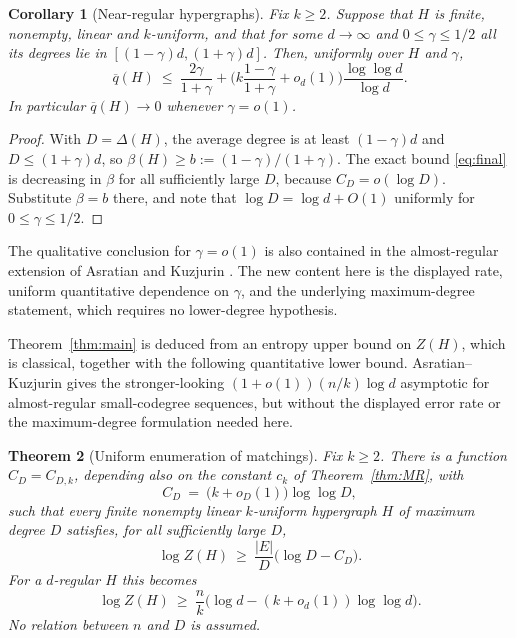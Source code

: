 \documentclass[10pt,a4paper]{amsart}
\newtheorem{theorem}{Theorem}[section]
\newtheorem{corollary}[theorem]{Corollary}
\newcommand{\EE}{E}
\newcommand{\qbar}{\overline{q}}
\newcommand{\Deltaop}{\Delta}
\begin{document}
\begin{corollary}[Near-regular hypergraphs]
\label{cor:nearregular}
Fix $k\ge2$. Suppose that $H$ is finite, nonempty, linear and $k$-uniform, and that for
some $d\to\infty$ and $0\le\gamma\le1/2$ all its degrees lie in
$[(1-\gamma)d,(1+\gamma)d]$. Then, uniformly over $H$ and $\gamma$,
\[
  \qbar(H)\ \le\ \frac{2\gamma}{1+\gamma}
  +\biggl(k\frac{1-\gamma}{1+\gamma}+o_d(1)\biggr)
       \frac{\log\log d}{\log d}.
\]
In particular $\qbar(H)\to0$ whenever $\gamma=o(1)$.
\end{corollary}

\begin{proof}
With $D=\Deltaop(H)$, the average degree is at least $(1-\gamma)d$ and
$D\le(1+\gamma)d$, so $\beta(H)\ge b:=(1-\gamma)/(1+\gamma)$. The exact bound
\eqref{eq:final} is decreasing in $\beta$ for all sufficiently large $D$, because
$C_D=o(\log D)$. Substitute $\beta=b$ there, and note that
$\log D=\log d+O(1)$ uniformly for $0\le\gamma\le1/2$.
\end{proof}

The qualitative conclusion for $\gamma=o(1)$ is also contained in the almost-regular
extension of Asratian and Kuzjurin \cite[\S3]{AsratianKuzjurin}. The new content here is
the displayed rate, uniform quantitative dependence on $\gamma$, and the underlying
maximum-degree statement, which requires no lower-degree hypothesis.

Theorem~\ref{thm:main} is deduced from an entropy upper bound on $Z(H)$, which is
classical, together with the following quantitative lower bound. Asratian--Kuzjurin
\cite[Corollary 1]{AsratianKuzjurin} gives the stronger-looking
$(1+o(1))(n/k)\log d$ asymptotic for almost-regular small-codegree sequences, but without the
displayed error rate or the maximum-degree formulation needed here.

\begin{theorem}[Uniform enumeration of matchings]
\label{thm:engine}
Fix $k\ge2$. There is a function $C_D=C_{D,k}$, depending also on the constant $c_k$ of
Theorem~\ref{thm:MR}, with
\[
  C_D\ =\ \bigl(k+o_D(1)\bigr)\log\log D,
\]
such that every finite nonempty linear $k$-uniform hypergraph $H$ of maximum degree $D$
satisfies, for all sufficiently large $D$,
\[
  \log Z(H)\ \ge\ \frac{|\EE|}{D}\bigl(\log D-C_D\bigr).
\]
For a $d$-regular $H$ this becomes
\[
  \log Z(H)\ \ge\ \frac{n}{k}
  \bigl(\log d-(k+o_d(1))\log\log d\bigr).
\]
No relation between $n$ and $D$ is assumed.
\end{theorem}
\end{document}

